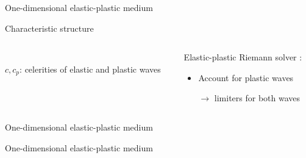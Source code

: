 \begin{frame}{One-dimensional elastic-plastic medium}
\begin{block}{\footnotesize Characteristic structure \cite{Wang}}
\begin{columns}
\begin{column}{0.49\textwidth}
\begin{tikzpicture}[scale=0.6]
        \end{tikzpicture}\\
        \footnotesize $c,c_p$: celerities of elastic and plastic waves
      \end{column}
      \begin{column}{0.49\textwidth}
        \begin{block}{}
          \vspace{-0.95cm}
          \footnotesize Elastic-plastic Riemann solver \cite{Fogarty,Thomas_EP}:
          \begin{footnotesize}
            \begin{itemize}
            \item Account for \alert{plastic waves} 
            \item[$\rightarrow$] limiters for both waves
            \end{itemize}
          \end{footnotesize}
        \end{block}
      \end{column}
    \end{columns}
  \end{block}
  \vspace{-0.2cm}
\end{frame}

\begin{frame}{One-dimensional elastic-plastic medium \cite{Thomas_EP}}
  \centering
  \vspace{-0.2cm}
\end{frame}


\begin{frame}{}
  \begin{block}{One-dimensional elastic-plastic medium \cite{Thomas_EP}}
  \end{block}
  \begin{overprint}
    \centering
    
    \centering
    
    
    \centering
    
      
  \end{overprint}
  \vspace{-0.1cm}
\end{frame}



